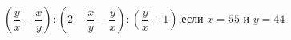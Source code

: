 \begin{ex}[type=calculate_expression]
	\begin{condition}
		\( \left( \dfrac{y}{x}-\dfrac{x}{y} \right):\left( 2-\dfrac{x}{y}-\dfrac{y}{x} \right):\left( \dfrac{y}{x}+1 \right) \),\hspace{0.5cm}если \( x=55 \) и \( y=44 \)
	\end{condition}
\end{ex}